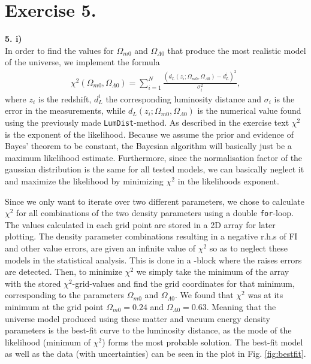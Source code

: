 \documentclass{emulateapj}
\begin{document}
 	\section*{Exercise 5.}
 	\textbf{5. i)}\\
 	In order to find the values for $\Omega_{m 0}$ and $\Omega_{\Lambda 0}$ that produce the most realistic model of the universe, we implement the formula 
 	\begin{align}
 		\chi^2(\Omega_{m 0}, \Omega_{\Lambda 0}) = \sum_{i = 1}^{N} \frac{(d_L(z_i;\Omega_{m 0}, \Omega_{\Lambda 0}) - d^i_L)^2}{\sigma_i^2},
 	\end{align}
 	where $z_i$ is the redshift, $d^i_L$
 	the corresponding luminosity distance and $\sigma_i$ is the error in the measurements, while $d_L(z_i;\Omega_{m 0}, \Omega_{\Lambda 0})$ is the numerical value found using the previously made \texttt{LumDist}-method. As described in the exercise text $\chi^2$ is the exponent of the likelihood. Because we assume the prior and evidence of Bayes’ theorem to be constant, the Bayesian algorithm will basically just be a maximum likelihood estimate. Furthermore, since the normalisation factor of the gaussian distribution is the same for all tested models, we can basically neglect it and maximize the likelihood by minimizing  $\chi^2$ in the likelihoods exponent.
 	
 	Since we only want to iterate over two different parameters, we chose to calculate $\chi^2$ for all combinations of the two density parameters using a double \texttt{for}-loop. The values calculated in each grid point are stored in a 2D array for later plotting. The density parameter combinations resulting in a negative r.h.s of FI and other value errors, are given an infinite value of $\chi^2$ so as to neglect these models in the statistical analysis. This is done in a -block where the raises errors are detected. Then, to minimize $\chi^2$ we simply take the minimum of the array with the stored $\chi^2$-grid-values and find the grid coordinates for that minimum, corresponding to the parameters $\Omega_{m 0}$ and $\Omega_{\Lambda 0}$. We found that $\chi^2$ was at its minimum at the grid point $\Omega_{m 0} = 0.24$ and $\Omega_{\Lambda 0} = 0.63$. Meaning that the universe model produced using these matter and vacuum energy density parameters is the best-fit curve to the luminosity distance, as the mode of the likelihood (minimum of $\chi^2$) forms the most probable solution. The best-fit model as well as the data (with uncertainties) can be seen in the plot in Fig. \ref{fig:bestfit}.\\
 	
\end{document}
